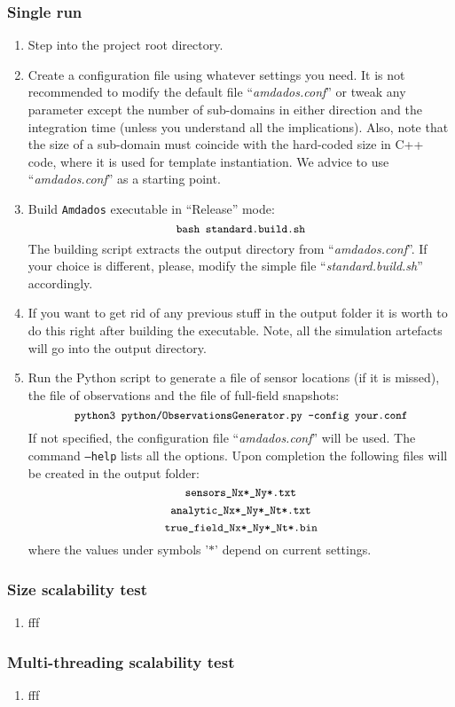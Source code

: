 \documentclass[]{article}
\begin{document}
\subsubsection{Single run}
\begin{enumerate}
\item Step into the project root directory.
\item Create a configuration file using whatever settings you need. It is not recommended to modify the default file ``\textit{amdados.conf}'' or tweak any parameter except the number of sub-domains in either direction and the integration time (unless you understand all the implications). Also, note that the size of a sub-domain must coincide with the hard-coded size in C++ code, where it is used for template instantiation. We advice to use ``\textit{amdados.conf}'' as a starting point.
\item Build \texttt{Amdados} executable in ``Release'' mode:
$$
\mbox{\small\texttt{bash standard.build.sh}}
$$
The building script extracts the output directory from ``\textit{amdados.conf}''. If your choice is different, please, modify the simple file ``\textit{standard.build.sh}'' accordingly.
\item If you want to get rid of any previous stuff in the output folder it is worth to do this right after building the executable. Note, all the simulation artefacts will go into the output directory. 
\item Run the Python script to generate a file of sensor locations (if it is missed), the file of observations and the file of full-field snapshots:
$$
\mbox{\small\texttt{python3 python/ObservationsGenerator.py --config your.conf}}
$$
If not specified, the configuration file ``\textit{amdados.conf}'' will be used. The command \texttt{--help} lists all the options. Upon completion the following files will be created in the output folder:
$$\mbox{\small\texttt{sensors\_Nx*\_Ny*.txt}}$$
$$\mbox{\small\texttt{analytic\_Nx*\_Ny*\_Nt*.txt}}$$
$$\mbox{\small\texttt{true\_field\_Nx*\_Ny*\_Nt*.bin}}$$
where the values under symbols '$*$' depend on current settings.
\end{enumerate}
\subsubsection{Size scalability test}
\begin{enumerate}
\item fff
\end{enumerate}
\subsubsection{Multi-threading scalability test}
\begin{enumerate}
\item fff
\end{enumerate}
\end{document}
